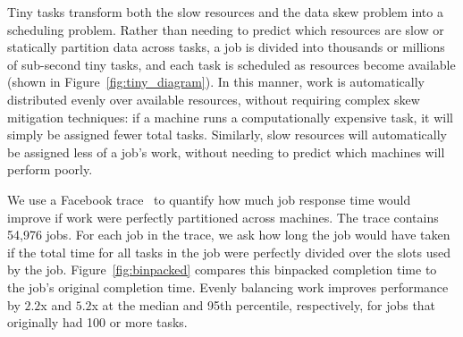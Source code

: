Tiny tasks transform both the slow resources and the data skew problem
into a scheduling problem.  Rather than needing to predict which resources
are slow or statically partition data across tasks, a job is divided into
thousands or millions of sub-second tiny tasks, and each task is scheduled
as resources become available (shown in Figure~\ref{fig:tiny_diagram}).  In this manner, work is automatically
distributed evenly over available resources, without requiring complex skew
mitigation techniques: if a machine runs a computationally expensive task, it
will simply be assigned fewer total tasks.  Similarly, slow resources will
automatically be assigned less of a job's work, without needing to predict which
machines will perform poorly.

We use a Facebook trace~\cite{chen2012interactive} to quantify how much job response time would
improve if work were perfectly partitioned across machines.
The trace contains 54,976 jobs.
For each job in the trace, we ask how long the job would have taken if the
total time for all tasks in the job were perfectly divided over the slots
used by the job.
Figure~\ref{fig:binpacked} compares this binpacked completion time to the
job's original completion time. Evenly balancing work improves performance by
$2.2$x and $5.2$x at the median and 95th percentile, respectively, for
jobs that originally had 100 or more tasks.
